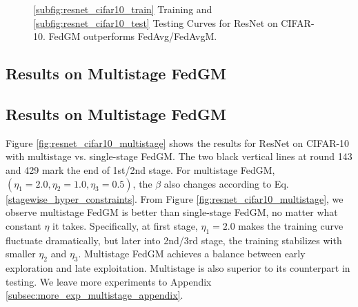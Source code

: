 \begin{figure}[h]

\centering
{}
\hspace{-6pt}

\caption{\ref{subfig:resnet_cifar10_train} Training and \ref{subfig:resnet_cifar10_test} Testing Curves for ResNet on CIFAR-10. FedGM outperforms FedAvg/FedAvgM.}
\label{fig:resnet_cifar10}
\vspace*{-10pt}
\end{figure}

\subsection{Results on Multistage FedGM}
\label{subsec:exp_multistage_fedgm}

\fi




\subsection{Results on Multistage FedGM}
\label{subsec:exp_multistage_fedgm}


Figure \ref{fig:resnet_cifar10_multistage} shows the results for ResNet on CIFAR-10 with multistage vs. single-stage FedGM. The two black vertical lines at round 143 and 429 mark the end of 1st/2nd stage. For multistage FedGM, $(\eta_1=2.0,\eta_2=1.0,\eta_3=0.5)$, the $\beta$ also changes according to Eq. \ref{stagewise_hyper_constraints}. From Figure \ref{fig:resnet_cifar10_multistage}, we observe multistage FedGM is better than single-stage FedGM, no matter what constant $\eta$ it takes. Specifically, at first stage, $\eta_1=2.0$ makes the training curve fluctuate dramatically, but later into 2nd/3rd stage, the training stabilizes with smaller $\eta_2$ and $\eta_3$. Multistage FedGM achieves a balance between early exploration and late exploitation. Multistage is also superior to its counterpart in testing. We leave more experiments to Appendix \ref{subsec:more_exp_multistage_appendix}.

